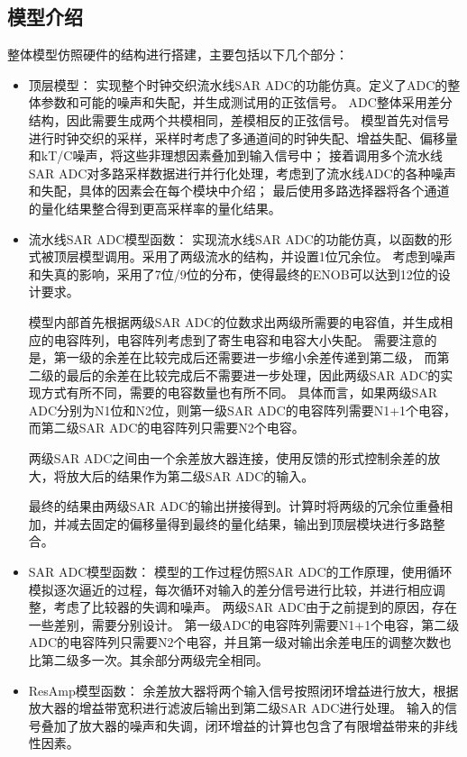 \documentclass[cs4size,a4paper]{ctexart}
\numberwithin{equation}{section}
\numberwithin{table}{section}
\numberwithin{figure}{section}
\begin{document}
	\subsection{模型介绍}
	整体模型仿照硬件的结构进行搭建，主要包括以下几个部分：
	\begin{itemize}
		\item 顶层模型：
		实现整个时钟交织流水线SAR ADC的功能仿真。定义了ADC的整体参数和可能的噪声和失配，并生成测试用的正弦信号。
		ADC整体采用差分结构，因此需要生成两个共模相同，差模相反的正弦信号。
		模型首先对信号进行时钟交织的采样，采样时考虑了多通道间的时钟失配、增益失配、偏移量和kT/C噪声，将这些非理想因素叠加到输入信号中；
		接着调用多个流水线SAR ADC对多路采样数据进行并行化处理，考虑到了流水线ADC的各种噪声和失配，具体的因素会在每个模块中介绍；
		最后使用多路选择器将各个通道的量化结果整合得到更高采样率的量化结果。
		
		\item 流水线SAR ADC模型函数：
		实现流水线SAR ADC的功能仿真，以函数的形式被顶层模型调用。采用了两级流水的结构，并设置1位冗余位。
		考虑到噪声和失真的影响，采用了7位/9位的分布，使得最终的ENOB可以达到12位的设计要求。

		模型内部首先根据两级SAR ADC的位数求出两级所需要的电容值，并生成相应的电容阵列，电容阵列考虑到了寄生电容和电容大小失配。
		需要注意的是，第一级的余差在比较完成后还需要进一步缩小余差传递到第二级，
		而第二级的最后的余差在比较完成后不需要进一步处理，因此两级SAR ADC的实现方式有所不同，需要的电容数量也有所不同。
		具体而言，如果两级SAR ADC分别为N1位和N2位，则第一级SAR ADC的电容阵列需要N1+1个电容，而第二级SAR ADC的电容阵列只需要N2个电容。
		
		两级SAR ADC之间由一个余差放大器连接，使用反馈的形式控制余差的放大，将放大后的结果作为第二级SAR ADC的输入。

		最终的结果由两级SAR ADC的输出拼接得到。计算时将两级的冗余位重叠相加，并减去固定的偏移量得到最终的量化结果，输出到顶层模块进行多路整合。

		\item SAR ADC模型函数：
		模型的工作过程仿照SAR ADC的工作原理，使用循环模拟逐次逼近的过程，每次循环对输入的差分信号进行比较，并进行相应调整，考虑了比较器的失调和噪声。
		两级SAR ADC由于之前提到的原因，存在一些差别，需要分别设计。
		第一级ADC的电容阵列需要N1+1个电容，第二级ADC的电容阵列只需要N2个电容，并且第一级对输出余差电压的调整次数也比第二级多一次。其余部分两级完全相同。

		\item ResAmp模型函数：
		余差放大器将两个输入信号按照闭环增益进行放大，根据放大器的增益带宽积进行滤波后输出到第二级SAR ADC进行处理。
		输入的信号叠加了放大器的噪声和失调，闭环增益的计算也包含了有限增益带来的非线性因素。


\end{itemize}
\end{document}
